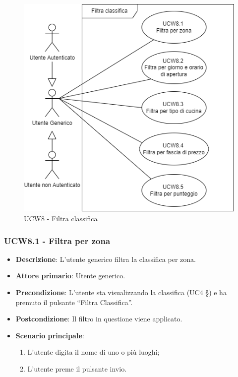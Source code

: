 \begin{figure}[!h]
\centering
    \includegraphics[scale=0.5]{UC_images/UCW8.png}
    \caption{UCW8 - Filtra classifica}
\end{figure}

\subsubsection{UCW8.1 - Filtra per zona}
\begin{itemize}
	\item \textbf{Descrizione}: L'utente generico filtra la classifica per zona.
    \item \textbf{Attore primario}: Utente generico.
    \item \textbf{Precondizione}: L’utente sta visualizzando la classifica (UC4 §) e ha premuto il pulsante “Filtra Classifica”.
    \item \textbf{Postcondizione}: Il filtro in questione viene applicato.
    \item \textbf{Scenario principale}: 
    \begin{enumerate}
        \item L’utente digita il nome di uno o più luoghi;
        \item L’utente preme il pulsante invio.
    \end{enumerate}
\end{itemize}

